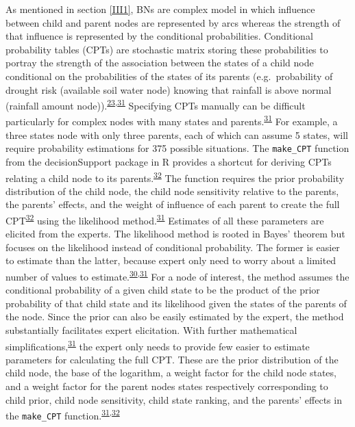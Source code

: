 \documentclass[12pt,oneside]{article}
\begin{document}
As mentioned in section \ref{III1}, BNs are complex model in which influence between child and parent nodes are represented by arcs whereas the strength of that influence is represented by the conditional probabilities. Conditional probability tables (CPTs) are stochastic matrix storing these probabilities to portray the strength of the association between the states of a child node conditional on the probabilities of the states of its parents (e.g.~probability of drought risk (available soil water node) knowing that rainfall is above normal (rainfall amount node)).\textsuperscript{\protect\hyperlink{ref-Scutari_and_Denis_2015}{23},\protect\hyperlink{ref-Hansson_and_Sjokvist_2013}{31}} Specifying CPTs manually can be difficult particularly for complex nodes with many states and parents.\textsuperscript{\protect\hyperlink{ref-Hansson_and_Sjokvist_2013}{31}} For example, a three states node with only three parents, each of which can assume 5 states, will require probability estimations for 375 possible situations. The \texttt{make\_CPT} function from the decisionSupport package in R provides a shortcut for deriving CPTs relating a child node to its parents.\textsuperscript{\protect\hyperlink{ref-Luedeling_and_Goehring_2018}{32}} The function requires the prior probability distribution of the child node, the child node sensitivity relative to the parents, the parents' effects, and the weight of influence of each parent to create the full CPT\textsuperscript{\protect\hyperlink{ref-Luedeling_and_Goehring_2018}{32}} using the likelihood method.\textsuperscript{\protect\hyperlink{ref-Hansson_and_Sjokvist_2013}{31}} Estimates of all these parameters are elicited from the experts. The likelihood method is rooted in Bayes' theorem but focuses on the likelihood instead of conditional probability. The former is easier to estimate than the latter, because expert only need to worry about a limited number of values to estimate.\textsuperscript{\protect\hyperlink{ref-Whitney_et_al_2018a}{30},\protect\hyperlink{ref-Hansson_and_Sjokvist_2013}{31}} For a node of interest, the method assumes the conditional probability of a given child state to be the product of the prior probability of that child state and its likelihood given the states of the parents of the node. Since the prior can also be easily estimated by the expert, the method substantially facilitates expert elicitation. With further mathematical simplifications,\textsuperscript{\protect\hyperlink{ref-Hansson_and_Sjokvist_2013}{31}} the expert only needs to provide few easier to estimate parameters for calculating the full CPT. These are the prior distribution of the child node, the base of the logarithm, a weight factor for the child node states, and a weight factor for the parent nodes states respectively corresponding to child prior, child node sensitivity, child state ranking, and the parents' effects in the \texttt{make\_CPT} function.\textsuperscript{\protect\hyperlink{ref-Hansson_and_Sjokvist_2013}{31},\protect\hyperlink{ref-Luedeling_and_Goehring_2018}{32}}
\end{document}
